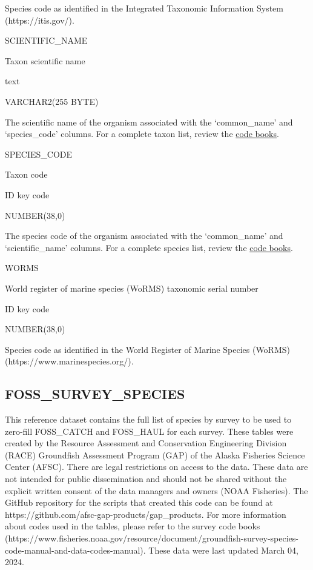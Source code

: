 \documentclass[
  letterpaper,
  oneside,
  open=any]{scrbook}
\begin{document}
Species code as identified in the Integrated Taxonomic Information
System (https://itis.gov/).

SCIENTIFIC\_NAME

Taxon scientific name

text

VARCHAR2(255 BYTE)

The scientific name of the organism associated with the `common\_name'
and `species\_code' columns. For a complete taxon list, review the
\href{https://www.fisheries.noaa.gov/resource/document/groundfish-survey-species-code-manual-and-data-codes-manual}{code
books}.

SPECIES\_CODE

Taxon code

ID key code

NUMBER(38,0)

The species code of the organism associated with the `common\_name' and
`scientific\_name' columns. For a complete species list, review the
\href{https://www.fisheries.noaa.gov/resource/document/groundfish-survey-species-code-manual-and-data-codes-manual}{code
books}.

WORMS

World register of marine species (WoRMS) taxonomic serial number

ID key code

NUMBER(38,0)

Species code as identified in the World Register of Marine Species
(WoRMS) (https://www.marinespecies.org/).

\hypertarget{foss_survey_species}{%
\subsection{FOSS\_SURVEY\_SPECIES}\label{foss_survey_species}}

This reference dataset contains the full list of species by survey to be
used to zero-fill FOSS\_CATCH and FOSS\_HAUL for each survey. These
tables were created by the Resource Assessment and Conservation
Engineering Division (RACE) Groundfish Assessment Program (GAP) of the
Alaska Fisheries Science Center (AFSC). There are legal restrictions on
access to the data. These data are not intended for public dissemination
and should not be shared without the explicit written consent of the
data managers and owners (NOAA Fisheries). The GitHub repository for the
scripts that created this code can be found at
https://github.com/afsc-gap-products/gap\_products. For more information
about codes used in the tables, please refer to the survey code books
(https://www.fisheries.noaa.gov/resource/document/groundfish-survey-species-code-manual-and-data-codes-manual).
These data were last updated March 04, 2024.
\end{document}
